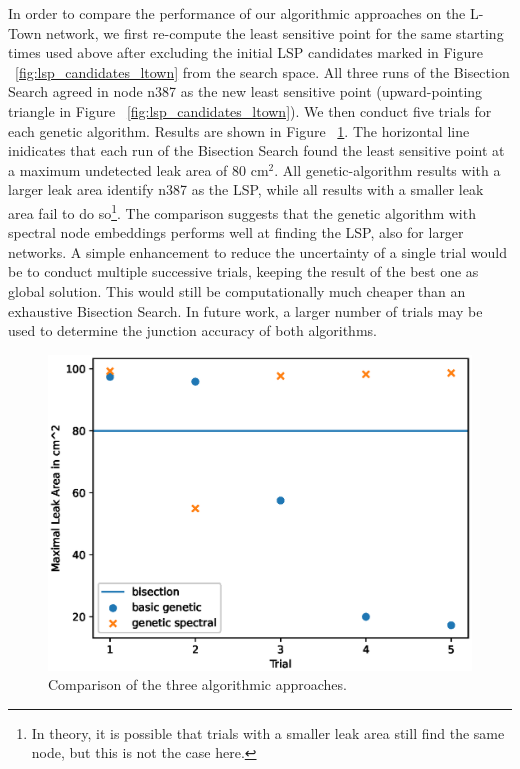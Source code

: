 In order to compare the performance of our algorithmic approaches on the L-Town
network, we first re-compute the least sensitive point for the same starting
times used above after excluding the initial LSP candidates marked in Figure
~\ref{fig:lsp_candidates_ltown} from the search space. All three runs of
the Bisection Search agreed in node n387 as the new least sensitive point
(upward-pointing triangle in Figure ~\ref{fig:lsp_candidates_ltown}). We then
conduct five trials for each genetic algorithm.
Results are shown in Figure ~\ref{fig:luca_ftw}. The horizontal line
inidicates that each run of the Bisection Search found the least sensitive point at a
maximum undetected leak area of 80 $\text{cm}^2$. All genetic-algorithm
results with a larger leak area identify n387 as the LSP, while all results
with a smaller leak area fail to do so\footnote{In theory, it is possible that trials with a smaller leak area  still find the same node, but this is not the case here.}. The comparison suggests that the genetic algorithm with spectral node embeddings performs well at finding the LSP, also
for larger networks. A simple enhancement to reduce the uncertainty of a
single trial would be to conduct multiple successive trials, keeping the
result of the best one as global solution. This would still be computationally much
cheaper than an exhaustive Bisection Search. In future
work, a larger number of trials may be used to determine the junction accuracy
of both algorithms.
\begin{figure}[h]
\centering
\includegraphics[width=\textwidth,height=0.3\textheight,keepaspectratio=true]{Figures/algorithm_comparison_ltown.eps}
\caption{Comparison of the three algorithmic approaches. }
\label{fig:luca_ftw}
\end{figure}

